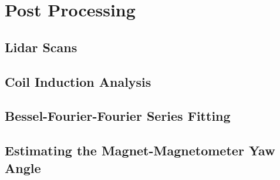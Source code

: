 \chapter{Post Processing}
\section{Lidar Scans}
\section{Coil Induction Analysis}
\section{Bessel-Fourier-Fourier Series Fitting}
\section{Estimating the Magnet-Magnetometer Yaw Angle}